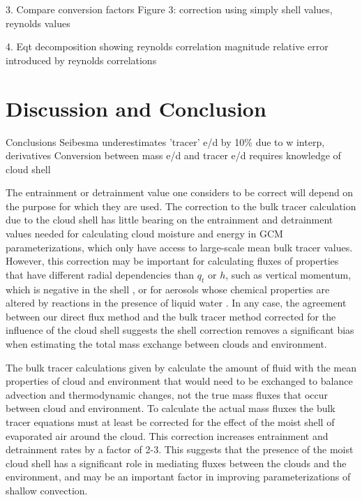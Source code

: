 \documentclass[draft,grl]{AGUTeX}
\begin{document}
\begin{article}
3. Compare conversion factors
    Figure 3: correction using simply shell values, reynolds values

4. Eqt decomposition showing reynolds correlation magnitude
    relative error introduced by reynolds correlations



\section{Discussion and Conclusion}

Conclusions
Seibesma underestimates 'tracer' e/d by 10\% due to w interp, derivatives
Conversion between mass e/d and tracer e/d requires knowledge of cloud shell

The entrainment or detrainment value one considers to be correct will depend on 
the purpose for which they are used.  The correction to the bulk tracer 
calculation due to the cloud shell has little bearing on the entrainment and 
detrainment values needed for calculating cloud moisture and energy in GCM 
parameterizations, which only have access to large-scale mean bulk tracer 
values.  However, this correction may be important for calculating 
fluxes of properties that have different radial dependencies than $q_t$ or $h$, 
such as vertical momentum, which is negative in the shell \citep{Heus2008}, or 
for aerosols whose chemical properties are altered by reactions in the presence 
of liquid water \citep{Hoppel1994}.  In any case, the agreement between our 
direct flux method and the bulk tracer method corrected for the influence of 
the cloud shell suggests the shell correction removes a significant bias when 
estimating the total mass exchange between clouds and environment.

The bulk tracer calculations given by \cite{Siebesma1995} calculate the amount
of fluid with the mean properties of cloud and environment that would need to
be exchanged to balance advection and thermodynamic changes, not the true mass
fluxes that occur between cloud and environment.  To calculate the actual mass
fluxes the bulk tracer equations must at least be corrected for the effect of
the moist shell of evaporated air around the cloud.  This correction increases
entrainment and detrainment rates by a factor of 2-3.  This suggests that the
presence of the moist cloud shell has a significant role in mediating fluxes
between the clouds and the environment, and may be an important factor in 
improving parameterizations of shallow convection.



\end{article}
\end{document}
